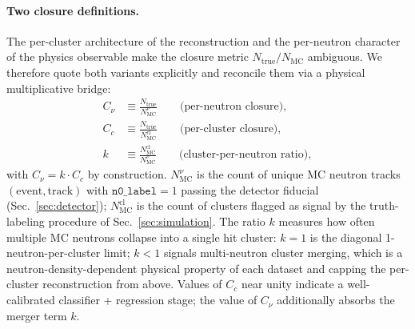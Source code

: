 \documentclass[aps,prc,twocolumn,superscriptaddress,showpacs,%
               nofootinbib,floatfix,longbibliography]{revtex4-2}
\newcommand{\Ntrue}{N_{\text{true}}}
\begin{document}
\paragraph*{Two closure definitions.}
The per-cluster architecture of the reconstruction and the per-neutron
character of the physics observable make the closure metric
$\Ntrue/N_{\text{MC}}$ ambiguous.  We therefore quote both variants
explicitly and reconcile them via a physical multiplicative bridge:
\begin{align}
  C_\nu &\equiv \frac{\Ntrue}{N_{\text{MC}}^{\nu}}
    \qquad \text{(per-neutron closure)}, \label{eq:cnu}\\
  C_c &\equiv \frac{\Ntrue}{N_{\text{MC}}^{\text{cl}}}
    \qquad \text{(per-cluster closure)}, \label{eq:ccl}\\
  k   &\equiv \frac{N_{\text{MC}}^{\text{cl}}}{N_{\text{MC}}^{\nu}}
    \qquad \text{(cluster-per-neutron ratio)}, \label{eq:kratio}
\end{align}
with $C_\nu = k \cdot C_c$ by construction.
$N_{\text{MC}}^{\nu}$ is the count of unique MC neutron tracks
$(\text{event},\text{track})$ with $\texttt{n0\_label}=1$ passing the
detector fiducial (Sec.~\ref{sec:detector}); $N_{\text{MC}}^{\text{cl}}$
is the count of clusters flagged as signal by the truth-labeling
procedure of Sec.~\ref{sec:simulation}.  The ratio $k$ measures how
often multiple MC neutrons collapse into a single hit cluster:
$k = 1$ is the diagonal 1-neutron-per-cluster limit;
$k < 1$ signals multi-neutron cluster merging, which is a
neutron-density-dependent physical property of each dataset and
capping the per-cluster reconstruction from above.
Values of $C_c$ near unity indicate a well-calibrated
classifier + regression stage; the value of $C_\nu$ additionally
absorbs the merger term $k$.
\end{document}
